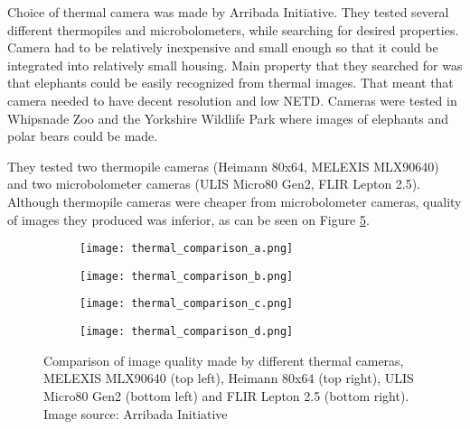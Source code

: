 Choice of thermal camera was made by Arribada Initiative\cite{thermal_comparison}.
They tested several different thermopiles and microbolometers, while searching for desired properties.
Camera had to be relatively inexpensive and small enough so that it could be integrated into relatively small housing.
Main property that they searched for was that elephants could be easily recognized from thermal images.
That meant that camera needed to have decent resolution and low NETD.
Cameras were tested in Whipsnade Zoo and the Yorkshire Wildlife Park where images of elephants and polar bears could be made.

They tested two thermopile cameras (Heimann 80x64, MELEXIS MLX90640) and two microbolometer cameras (ULIS Micro80 Gen2, FLIR Lepton 2.5).
Although thermopile cameras were cheaper from microbolometer cameras, quality of images they produced was inferior, as can be seen on Figure \ref{thermal_comparison_images}.

\begin{figure}[ht]
    \begin{subfigure}{0.5\textwidth}
        \centering
        \texttt{[image: thermal\_comparison\_a.png]} 
        \label{thermal_comparison_a}
    \end{subfigure}
    \begin{subfigure}{0.5\textwidth}
        \centering
        \texttt{[image: thermal\_comparison\_b.png]} 
        \label{thermal_comparison_b}
    \end{subfigure}
    \begin{subfigure}{0.5\textwidth}
        \centering
        \texttt{[image: thermal\_comparison\_c.png]} 
        \label{thermal_comparison_c}
    \end{subfigure}
    \begin{subfigure}{0.5\textwidth}
        \centering
        \texttt{[image: thermal\_comparison\_d.png]} 
        \label{thermal_comparison_d}
    \end{subfigure}

\caption{Comparison of image quality made by different thermal cameras, MELEXIS MLX90640 (top left), Heimann 80x64 (top right), ULIS Micro80 Gen2 (bottom left) and FLIR Lepton 2.5 (bottom right). Image source: Arribada Initiative \cite{thermal_comparison}}
    \label{thermal_comparison_images}
\end{figure}

